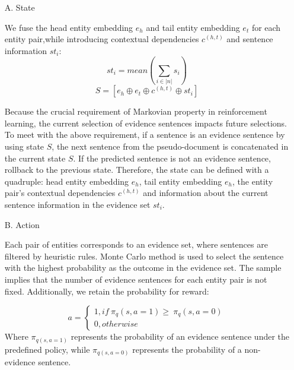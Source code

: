 \documentclass[preprint,12pt]{elsarticle}
\begin{document}
\begin{enumerate}
\item[A.]State 

 We fuse the head entity embedding $e_{h}$ and tail entity embedding $e_{t}$ for each entity pair,while introducing contextual dependencies $c^{(h,t)}$ and sentence information $st_i$:
\begin{equation}
{st}_{i} = mean\left( {\sum\limits_{i \in {|n|}}s_{i}} \right)
\label{eq24}
\end{equation}
\begin{equation}
S = \left\lbrack {e_{h} \oplus e_{t} \oplus c^{({h,t})} \oplus {st}_{i}} \right\rbrack
\label{eq25}
\end{equation}

Because the crucial requirement of Markovian property in reinforcement learning, the current selection of evidence sentences impacts future selections. To meet with the above requirement, if a sentence is an evidence sentence by using state $S$, the next sentence from the pseudo-document is concatenated in the current state $S$. If the predicted sentence is not an evidence sentence, rollback to the previous state. Therefore, the state can be defined with a quadruple: head entity embedding $e_h$, tail entity embedding $e_h$, the entity pair's contextual dependencies $c^{(h,t)}$ and information about the current sentence information in the evidence set $st_i$.

\item[B.]Action

Each pair of entities corresponds to an evidence set, where sentences are filtered by heuristic rules. Monte Carlo method is used to select the sentence with the highest probability as the outcome in the evidence set. The sample implies that the number of evidence sentences for each entity pair is not fixed. Additionally, we retain the probability for reward:

\begin{equation}
a = \left\{ \begin{matrix}
{1,if{~\pi}_{q}\left( {s,a = 1} \right) \geq {~\pi}_{q}\left( {s,a = 0} \right)} \\
{0,otherwise}
\end{matrix} \right.
\label{eq26}
\end{equation}
Where $\pi_{q(s,a=1)}$ represents the probability of an evidence sentence under the predefined policy, while $\pi_{q(s,a=0)}$ represents the probability of a non-evidence sentence.


\end{enumerate}
\end{document}
